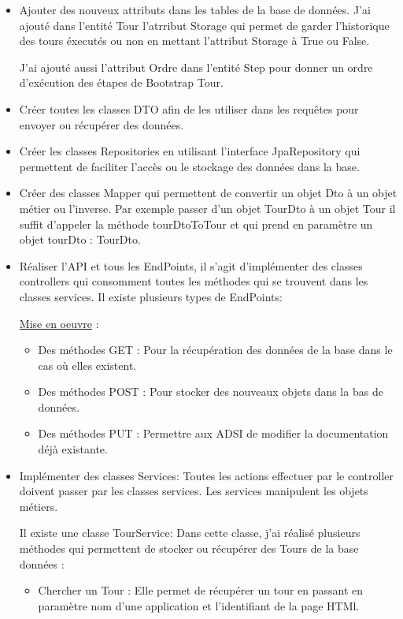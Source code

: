 \documentclass[12pt]{article}
\begin{document}
\begin{itemize}

\item  Ajouter des nouveux attributs dans les tables de la base de données. J'ai ajouté dans l'entité Tour  l'atrribut Storage qui permet de garder l'historique des tours éxecutés ou non en mettant l’attribut Storage à True ou False.
  
J'ai ajouté aussi l'attribut Ordre dans l'entité Step pour donner un ordre  d’exécution des étapes de Bootstrap Tour. 

\item Créer toutes les classes DTO afin de les utiliser dans les requêtes  pour envoyer ou récupérer des données.

\item Créer les classes Repositories en utilisant l'interface JpaRepository qui permettent de faciliter l'accès ou le stockage des données dans la base.

\item Créer des classes Mapper qui permettent de convertir un objet Dto à un objet métier ou l'inverse. Par exemple passer d'un objet TourDto à un objet Tour il suffit d'appeler la méthode tourDtoToTour et qui prend en paramètre un objet tourDto : TourDto.  

\item Réaliser l'API et tous les EndPoints, il s'agit d’implémenter des classes controllers qui consomment toutes les méthodes qui se trouvent dans les classes services. Il existe plusieurs types de EndPoints: 

\underline{Mise en oeuvre} : 
\begin{itemize}
\item Des méthodes GET : Pour la récupération des données de la base dans le cas où elles existent.

\item Des méthodes POST : Pour stocker des nouveaux objets dans la bas de données.

\item Des méthodes PUT : Permettre aux ADSI de modifier la documentation déjà existante. 

\end{itemize}
\item Implémenter des classes Services: Toutes les actions effectuer par le controller doivent passer par les classes services. Les services manipulent les objets métiers.

Il existe une classe TourService: Dans cette classe, j'ai réalisé plusieurs méthodes qui permettent de stocker ou récupérer des Tours de la base données : 
\begin{itemize}
\item Chercher un Tour : Elle permet de récupérer un tour en passant en paramètre nom d'une application et l'identifiant de la page HTMl. 


\end{itemize}
\end{itemize}
\end{document}

